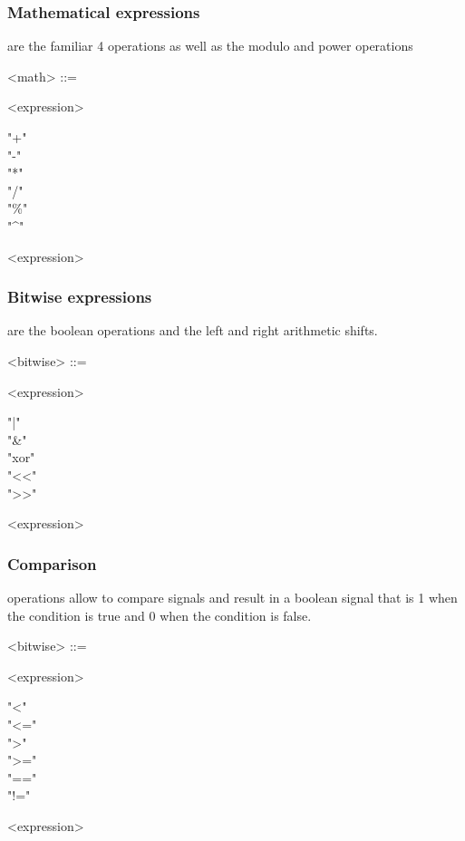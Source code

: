 \documentclass[a4paper,10pt]{book}
\begin{document}
\subsubsection{Mathematical expressions} are the familiar 4 operations as well as the modulo and power operations

\begin{grammar}
  <math> ::= 
  \begin{syntdiag}
    <expression>
    \begin{stack}
      "+" \\ "-" \\ "*" \\ "/" \\ "\%" \\ "^"
    \end{stack}
    <expression>
  \end{syntdiag}
\end{grammar}

\subsubsection{Bitwise expressions} are the boolean operations and the left and right arithmetic shifts.

\begin{grammar}
  <bitwise> ::= 
  \begin{syntdiag}
    <expression>
    \begin{stack}
      "|" \\ "\&" \\ "xor" \\ "<<" \\ ">>"
    \end{stack}
    <expression>
  \end{syntdiag}
\end{grammar}

\subsubsection{Comparison} operations allow to compare signals and result in a boolean signal that is 1 when the condition is true and 0 when the condition is false.

\begin{grammar}
  <bitwise> ::= 
  \begin{syntdiag}
    <expression>
    \begin{stack}
      "<" \\ "<=" \\ ">" \\ ">=" \\ "==" \\ "!="
    \end{stack}
    <expression>
  \end{syntdiag}
\end{grammar}
\end{document}
